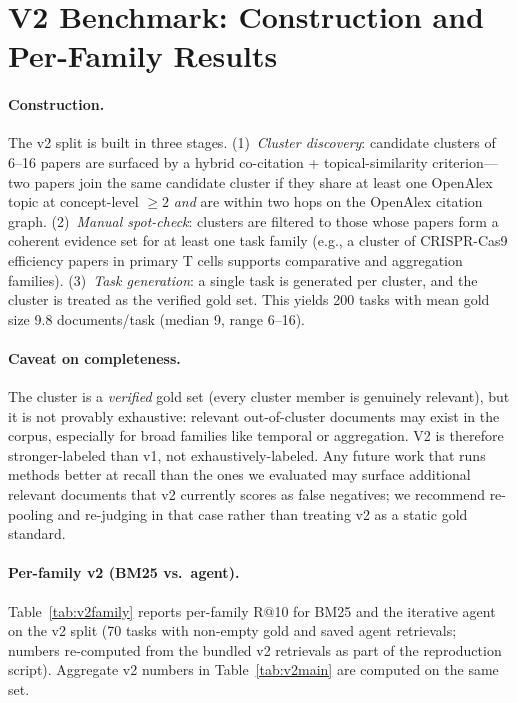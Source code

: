 \documentclass{article}
\begin{document}
\section{V2 Benchmark: Construction and Per-Family Results}
\label{app:v2}

\paragraph{Construction.} The v2 split is built in three stages. (1)~\emph{Cluster discovery}: candidate clusters of 6--16 papers are surfaced by a hybrid co-citation + topical-similarity criterion---two papers join the same candidate cluster if they share at least one OpenAlex topic at concept-level $\geq 2$ \emph{and} are within two hops on the OpenAlex citation graph. (2)~\emph{Manual spot-check}: clusters are filtered to those whose papers form a coherent evidence set for at least one task family (e.g., a cluster of CRISPR-Cas9 efficiency papers in primary T cells supports comparative and aggregation families). (3)~\emph{Task generation}: a single task is generated per cluster, and the cluster is treated as the verified gold set. This yields 200 tasks with mean gold size 9.8 documents/task (median 9, range 6--16).

\paragraph{Caveat on completeness.} The cluster is a \emph{verified} gold set (every cluster member is genuinely relevant), but it is not provably exhaustive: relevant out-of-cluster documents may exist in the corpus, especially for broad families like temporal or aggregation. V2 is therefore stronger-labeled than v1, not exhaustively-labeled. Any future work that runs methods better at recall than the ones we evaluated may surface additional relevant documents that v2 currently scores as false negatives; we recommend re-pooling and re-judging in that case rather than treating v2 as a static gold standard.

\paragraph{Per-family v2 (BM25 vs.\ agent).} Table~\ref{tab:v2family} reports per-family R@10 for BM25 and the iterative agent on the v2 split (70 tasks with non-empty gold and saved agent retrievals; numbers re-computed from the bundled v2 retrievals as part of the reproduction script). Aggregate v2 numbers in Table~\ref{tab:v2main} are computed on the same set.
\end{document}
